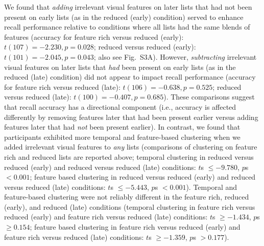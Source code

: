 \documentclass[11pt]{article}
\newcommand{\accuracyByList}{S3}
\begin{document}
We found that \textit{adding} irrelevant visual features on later lists that
had not been present on early lists (as in the reduced (early) condition)
served to enhance recall performance relative to conditions where all lists had
the same blends of features (accuracy for feature rich versus reduced (early):
$t(107) = -2.230, p = 0.028$; reduced versus reduced (early): $t(101) = -2.045,
p = 0.043$; also see Fig.~\accuracyByList A). However, \textit{subtracting}
irrelevant visual features on later lists that \textit{had} been present on
early lists (as in the reduced (late) condition) did not appear to impact
recall performance (accuracy for feature rich versus reduced (late): $t(106) =
-0.638, p = 0.525$; reduced versus reduced (late): $t(100) = -0.407, p =
0.685$). These comparisons suggest that recall accuracy has a directional
component (i.e., accuracy is affected differently by removing features later
that had been present earlier versus adding features later that had
\textit{not} been present earlier). In contrast, we found that participants
exhibited more temporal and feature-based clustering when we added irrelevant
visual features to \textit{any} lists (comparisons of clustering on feature
rich and reduced lists are reported above; temporal clustering in reduced
versus reduced (early) and reduced versus reduced (late) conditions: $t$s $\leq
-9.780$, $p$s $< 0.001$; feature based clustering in reduced versus reduced
(early) and reduced versus reduced (late) conditions: $t$s $\leq -5.443$, $p$s
$< 0.001$). Temporal and feature-based clustering were not reliably different
in the feature rich, reduced (early), and reduced (late) conditions (temporal
clustering in feature rich versus reduced (early) and feature rich versus
reduced (late) conditions: $t$s $\geq -1.434$, $p$s $\geq 0.154$; feature based
clustering in feature rich versus reduced (early) and feature rich versus
reduced (late) conditions: $t$s $\geq -1.359$, $p$s $> 0.177$).
\end{document}
